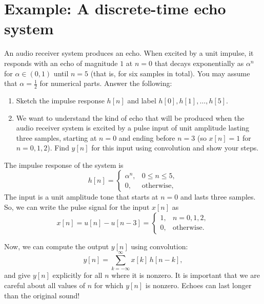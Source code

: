 \section{Example: A discrete-time echo system}
An audio receiver system produces an echo. When excited by a unit impulse, it responds with an echo of magnitude $1$ at $n=0$ that decays exponentially as $\alpha^n$ for $\alpha \in (0,1)$ until $n=5$ (that is, for six samples in total). You may assume that $\alpha = \tfrac{1}{2}$ for numerical parts. Answer the following:
\begin{enumerate}
    \item[(A)] Sketch the impulse response $h[n]$ and label $h[0], h[1], \ldots, h[5]$.
    \item[(B)] We want to understand the kind of echo that will be produced when the audio receiver system is excited by a pulse input of unit amplitude lasting three samples, starting at $n=0$ and ending before $n=3$ (so $x[n]=1$ for $n=0,1,2$). Find $y[n]$ for this input using convolution and show your steps.
\end{enumerate}
The impulse response of the system is
\[
h[n]=
\begin{cases}
\alpha^{n}, & 0\le n\le 5,\\
0, & \text{otherwise,}
\end{cases}
\]
The input is a unit amplitude tone that starts at $n=0$ and lasts three samples. So, we can write the pulse signal for the input $x[n]$ as
\[
x[n]=u[n]-u[n-3]=
\begin{cases}
1, & n=0,1,2,\\
0, & \text{otherwise.}
\end{cases}
\]

Now, we can compute the output $y[n]$ using convolution:
\[
y[n]=\sum_{k=-\infty}^{\infty} x[k]\,h[n-k],
\]
and give $y[n]$ explicitly for all $n$ where it is nonzero. It is important that we are careful about all values of $n$ for which $y[n]$ is nonzero. Echoes can last longer than the original sound!

